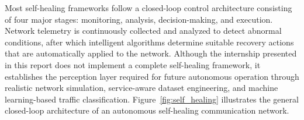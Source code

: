 \documentclass[12pt,a4paper]{report}
\begin{document}
	Most self-healing frameworks follow a closed-loop control architecture consisting of four major stages: monitoring, analysis, decision-making, and execution. Network telemetry is continuously collected and analyzed to detect abnormal conditions, after which intelligent algorithms determine suitable recovery actions that are automatically applied to the network. Although the internship presented in this report does not implement a complete self-healing framework, it establishes the perception layer required for future autonomous operation through realistic network simulation, service-aware dataset engineering, and machine learning-based traffic classification. Figure~\ref{fig:self_healing} illustrates the general closed-loop architecture of an autonomous self-healing communication network.
	

	
\end{document}
